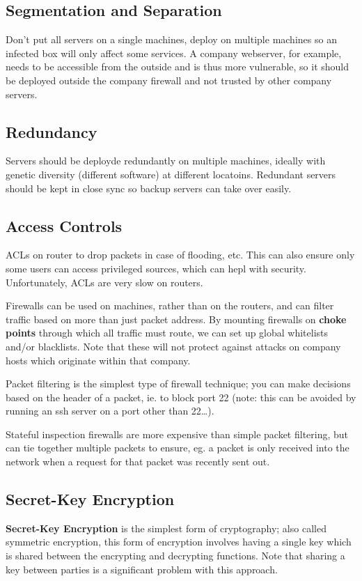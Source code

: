 \documentclass[12pt]{article}
\begin{document}
\subsection{Segmentation and Separation}
Don't put all servers on a single machines, deploy on multiple machines so an infected box will only affect some services. A company webserver, for example, needs to be accessible from the outside and is thus more vulnerable, so it should be deployed outside the company firewall and not trusted by other company servers.

\subsection{Redundancy}
Servers should be deployde redundantly on multiple machines, ideally with genetic diversity (different software) at different locatoins. Redundant servers should be kept in close sync so backup servers can take over easily.

\subsection{Access Controls}
ACLs on router to drop packets in case of flooding, etc. This can also ensure only some users can access privileged sources, which can hepl with security. Unfortunately, ACLs are very slow on routers.

Firewalls can be used on machines, rather than on the routers, and can filter traffic based on more than just packet address. By mounting firewalls on {\bf choke points} through which all traffic must route, we can set up global whitelists and/or blacklists. Note that these will not protect against attacks on company hosts which originate within that company.

Packet filtering is the simplest type of firewall technique; you can make decisions based on the header of a packet, ie. to block port 22 (note: this can be avoided by running an ssh server on a port other than 22\dots).

Stateful inspection firewalls are more expensive than simple packet filtering, but can tie together multiple packets to ensure, eg. a packet is only received into the network when a request for that packet was recently sent out.


\subsection{Secret-Key Encryption}
{\bf Secret-Key Encryption} is the simplest form of cryptography; also called symmetric encryption, this form of encryption involves having a single key which is shared between the encrypting and decrypting functions. Note that sharing a key between parties is a significant problem with this approach.
\end{document}
